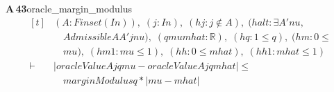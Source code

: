 \documentclass[conference]{IEEEtran}
\theoremstyle{definition}
\newcommand{\lean}[1]{\textsf{\footnotesize #1}}
\begin{document}
\noindent\textbf{A\,43}\quad\lean{oracle\_margin\_modulus}
{\footnotesize\[ \begin{aligned}[t]
&(\mathit{A} : \mathit{Finset} (\mathit{I} \mathit{n})),\; (\mathit{j} : \mathit{I} \mathit{n}),\; (\mathit{hj} : \mathit{j} \notin \mathit{A}),\; (\mathit{halt} : \exists \mathit{A'} \mathit{nu},\\
&\quad \mathit{Admissible} \mathit{A} \mathit{A'} \mathit{j} \mathit{nu}),\; (\mathit{q} \mathit{mu} \mathit{mhat} : \mathbb{R} ),\; (\mathit{hq} : 1 \leq \mathit{q}),\; (\mathit{hm} : 0 \leq\\
&\quad \mathit{mu}),\; (\mathit{hm1} : \mathit{mu} \leq 1),\; (\mathit{hh} : 0 \leq \mathit{mhat}),\; (\mathit{hh1} : \mathit{mhat} \leq 1)\\
\vdash\;&|\mathit{oracleValue} \mathit{A} \mathit{j} \mathit{q} \mathit{mu}-\mathit{oracleValue} \mathit{A} \mathit{j} \mathit{q} \mathit{mhat}| \leq\\
&\quad \mathit{marginModulus} \mathit{q}*|\mathit{mu}-\mathit{mhat}|
\end{aligned} \]}
\end{document}
